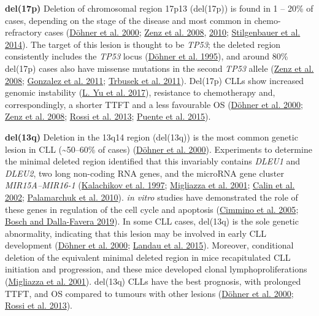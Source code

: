\documentclass[11pt, a4paper, twosided]{book}
\begin{document}
\textbf{del(17p)}
Deletion of chromosomal region 17p13 (del(17p)) is found in 1 -- 20\% of cases, depending on the stage of the disease and most common in chemo-refractory cases (\protect\hyperlink{ref-Dohner2000}{Döhner et al. 2000}; \protect\hyperlink{ref-Zenz2008}{Zenz et al. 2008}, \protect\hyperlink{ref-Zenz2010}{2010}; \protect\hyperlink{ref-Stilgenbauer2014}{Stilgenbauer et al. 2014}). The target of this lesion is thought to be \emph{TP53}; the deleted region consistently includes the \emph{TP53} locus (\protect\hyperlink{ref-Dohner1995}{Döhner et al. 1995}), and around 80\% del(17p) cases also have missense mutations in the second \emph{TP53} allele (\protect\hyperlink{ref-Zenz2008}{Zenz et al. 2008}; \protect\hyperlink{ref-Gonzalez2011}{Gonzalez et al. 2011}; \protect\hyperlink{ref-Trbusek2011}{Trbusek et al. 2011}). Del(17p) CLLs show increased genomic instability (\protect\hyperlink{ref-Yu2017}{L. Yu et al. 2017}), resistance to chemotherapy and, correspondingly, a shorter TTFT and a less favourable OS (\protect\hyperlink{ref-Dohner2000}{Döhner et al. 2000}; \protect\hyperlink{ref-Zenz2008}{Zenz et al. 2008}; \protect\hyperlink{ref-Rossi2013}{Rossi et al. 2013}; \protect\hyperlink{ref-Puente2015}{Puente et al. 2015}).

\textbf{del(13q)}
Deletion in the 13q14 region (del(13q)) is the most common genetic lesion in CLL (\textasciitilde50--60\% of cases) (\protect\hyperlink{ref-Dohner2000}{Döhner et al. 2000}). Experiments to determine the minimal deleted region identified that this invariably contains \emph{DLEU1} and \emph{DLEU2}, two long non-coding RNA genes, and the microRNA gene cluster \emph{MIR15A--MIR16-1} (\protect\hyperlink{ref-Kalachikov1997}{Kalachikov et al. 1997}; \protect\hyperlink{ref-Migliazza2001}{Migliazza et al. 2001}; \protect\hyperlink{ref-Calin2002}{Calin et al. 2002}; \protect\hyperlink{ref-Palamarchuk2010}{Palamarchuk et al. 2010}). \emph{in vitro} studies have demonstrated the role of these genes in regulation of the cell cycle and apoptosis (\protect\hyperlink{ref-Cimmino2005}{Cimmino et al. 2005}; \protect\hyperlink{ref-Bosch2019}{Bosch and Dalla-Favera 2019}). In some CLL cases, del(13q) is the sole genetic abnormality, indicating that this lesion may be involved in early CLL development (\protect\hyperlink{ref-Dohner2000}{Döhner et al. 2000}; \protect\hyperlink{ref-Landau2015}{Landau et al. 2015}). Moreover, conditional deletion of the equivalent minimal deleted region in mice recapitulated CLL initiation and progression, and these mice developed clonal lymphoproliferations (\protect\hyperlink{ref-Migliazza2001}{Migliazza et al. 2001}). del(13q) CLLs have the best prognosis, with prolonged TTFT, and OS compared to tumours with other lesions (\protect\hyperlink{ref-Dohner2000}{Döhner et al. 2000}; \protect\hyperlink{ref-Rossi2013}{Rossi et al. 2013}).
\end{document}
